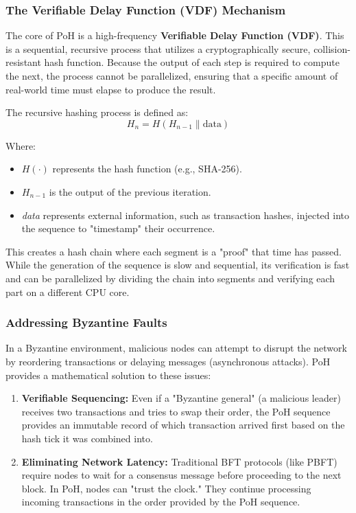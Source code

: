 \subsubsection{The Verifiable Delay Function (VDF) Mechanism}
The core of PoH is a high-frequency \textbf{Verifiable Delay Function (VDF)}. This is a sequential, recursive process that utilizes a cryptographically secure, collision-resistant hash function. Because the output of each step is required to compute the next, the process cannot be parallelized, ensuring that a specific amount of real-world time must elapse to produce the result.

The recursive hashing process is defined as:
\begin{equation}
    H_{n} = H(H_{n-1} \parallel \text{data})
\end{equation}

Where:
\begin{itemize}
    \item $H(\cdot)$ represents the hash function (e.g., SHA-256).
    \item $H_{n-1}$ is the output of the previous iteration.
    \item \textit{data} represents external information, such as transaction hashes, injected into the sequence to "timestamp" their occurrence.
\end{itemize}

This creates a hash chain where each segment is a "proof" that time has passed. While the generation of the sequence is slow and sequential, its verification is fast and can be parallelized by dividing the chain into segments and verifying each part on a different CPU core.

\subsubsection{Addressing Byzantine Faults}
In a Byzantine environment, malicious nodes can attempt to disrupt the network by reordering transactions or delaying messages (asynchronous attacks). PoH provides a mathematical solution to these issues:

\begin{enumerate}
    \item \textbf{Verifiable Sequencing:} Even if a "Byzantine general" (a malicious leader) receives two transactions and tries to swap their order, the PoH sequence provides an immutable record of which transaction arrived first based on the hash tick it was combined into.
    \item \textbf{Eliminating Network Latency:} Traditional BFT protocols (like PBFT) require nodes to wait for a consensus message before proceeding to the next block. In PoH, nodes can "trust the clock." They continue processing incoming transactions in the order provided by the PoH sequence.
\end{enumerate}

